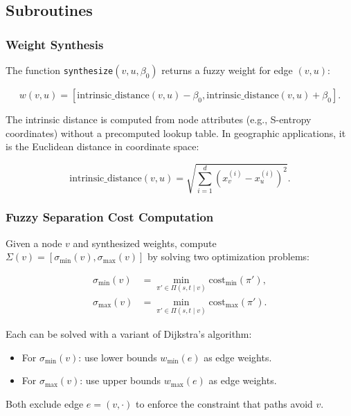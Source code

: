 \documentclass[twocolumn,11pt,a4paper]{article}
\theoremstyle{definition}
\begin{document}
\subsection{Subroutines}

\subsubsection{Weight Synthesis}

The function \texttt{synthesize}$(v, u, \beta_0)$ returns a fuzzy weight for edge $(v, u)$:

\begin{equation}
w(v, u) = [\text{intrinsic\_distance}(v, u) - \beta_0, \text{intrinsic\_distance}(v, u) + \beta_0].
\end{equation}

The intrinsic distance is computed from node attributes (e.g., S-entropy coordinates) without a precomputed lookup table. In geographic applications, it is the Euclidean distance in coordinate space:

\begin{equation}
\text{intrinsic\_distance}(v, u) = \sqrt{\sum_{i=1}^{d} (x_v^{(i)} - x_u^{(i)})^2}.
\end{equation}

\subsubsection{Fuzzy Separation Cost Computation}

Given a node $v$ and synthesized weights, compute $\Sigma(v) = [\sigma_{\min}(v), \sigma_{\max}(v)]$ by solving two optimization problems:

\begin{align}
\sigma_{\min}(v) &= \min_{\pi' \in \Pi(s, t \mid v)} \text{cost}_{\min}(\pi'), \label{eq:sigma_min} \\
\sigma_{\max}(v) &= \min_{\pi' \in \Pi(s, t \mid v)} \text{cost}_{\max}(\pi'). \label{eq:sigma_max}
\end{align}

Each can be solved with a variant of Dijkstra's algorithm:
\begin{itemize}
\item For $\sigma_{\min}(v)$: use lower bounds $w_{\min}(e)$ as edge weights.
\item For $\sigma_{\max}(v)$: use upper bounds $w_{\max}(e)$ as edge weights.
\end{itemize}

Both exclude edge $e = (v, \cdot)$ to enforce the constraint that paths avoid $v$.
\end{document}

